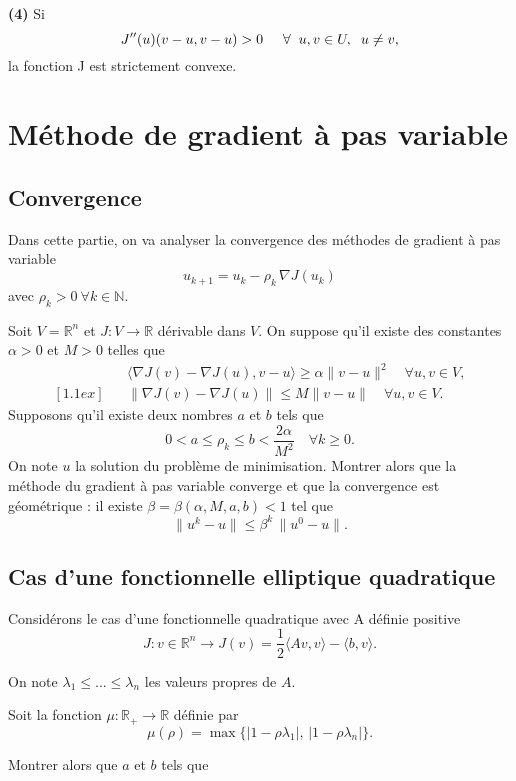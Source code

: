 \documentclass[11pt, a4paper]{article}
\begin{document}
\textbf{(4)} Si $$ J''(u)(v-u,v-u) > 0 \hspace{5mm} \forall \hspace{2mm} u,v \in U, \hspace{2mm} u\neq v,$$ la fonction J est strictement convexe.


\section{Méthode de gradient à pas variable}
\subsection{Convergence}
%
Dans cette partie, on va analyser la convergence des méthodes de gradient à pas
variable
\[
u_{k+1} = u_k - \rho_k \, \nabla J(u_k)
\]
avec $\rho_k>0\ \forall k\in\mathbb{N}$.

Soit $V=\mathbb{R}^n$ et $J:V\rightarrow \mathbb{R}$ dérivable dans $V$.
On suppose qu'il existe des constantes $\alpha>0$ et $M>0$ telles que
%
\begin{eqnarray*}
&& \langle \nabla J(v) - \nabla J(u),v-u \rangle \geq \alpha \|v-u\|^2\quad
\forall u,v\in V, \\ [1.1ex]
&& \|\nabla J(v)-\nabla J(u)\| \leq M \|v-u\|\quad \forall u,v\in V.
\end{eqnarray*}
%
Supposons qu'il existe deux nombres $a$ et $b$ tels que
\[
0<a \leq \rho_k \leq b < \frac{2\alpha}{M^2}\quad \forall k\geq 0.
\]
On note $u$ la solution du problème de minimisation.
Montrer alors que la méthode du gradient à pas variable converge et que la convergence
est géométrique : il existe $\beta=\beta(\alpha,M,a,b)<1$ tel que
\[
\|u^k-u\|\leq \beta^k\, \|u^0-u\|.
\]
%
\medskip
\subsection{Cas d'une fonctionnelle elliptique quadratique}
%
Considérons le cas d'une fonctionnelle quadratique avec A définie positive
\[
J: v\in \mathbb{R}^n \rightarrow  J(v) = \frac{1}{2}\langle Av,v\rangle - \langle b,v\rangle.
\]


On note $\lambda_1\leq ...\leq \lambda_n$ les valeurs propres de $A$. 

Soit la fonction
$\mu:\mathbb{R}_+\rightarrow\mathbb{R}$ définie par
\[
\mu(\rho) = \max\{ |1-\rho\lambda_1|,\, |1-\rho\lambda_n| \}.
\]

Montrer alors que $a$ et $b$ tels que
\end{document}
